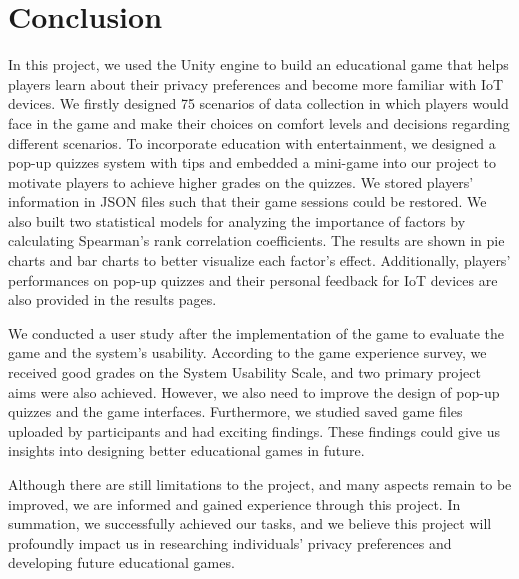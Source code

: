\documentclass[msc,deptreport,ai]{infthesis}      %
\begin{document}
\chapter{Conclusion}

In this project, we used the Unity engine to build an educational game that helps players learn about their privacy preferences and become more familiar with IoT devices. We firstly designed 75 scenarios of data collection in which players would face in the game and make their choices on comfort levels and decisions regarding different scenarios. To incorporate education with entertainment, we designed a pop-up quizzes system with tips and embedded a mini-game into our project to motivate players to achieve higher grades on the quizzes. We stored players' information in JSON files such that their game sessions could be restored. We also built two statistical models for analyzing the importance of factors by calculating Spearman's rank correlation coefficients. The results are shown in pie charts and bar charts to better visualize each factor's effect. Additionally, players' performances on pop-up quizzes and their personal feedback for IoT devices are also provided in the results pages.

We conducted a user study after the implementation of the game to evaluate the game and the system's usability. According to the game experience survey, we received good grades on the System Usability Scale, and two primary project aims were also achieved. However, we also need to improve the design of pop-up quizzes and the game interfaces. Furthermore, we studied saved game files uploaded by participants and had exciting findings. These findings could give us insights into designing better educational games in future.

Although there are still limitations to the project, and many aspects remain to be improved, we are informed and gained experience through this project. In summation, we successfully achieved our tasks, and we believe this project will profoundly impact us in researching individuals' privacy preferences and developing future educational games.


\end{document}
